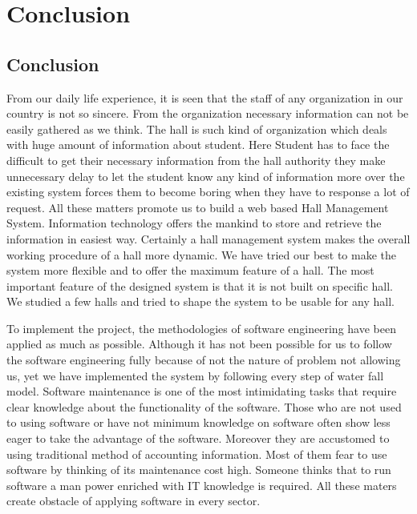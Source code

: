 


\chapter{Conclusion}
 \label{Chapter 7}
 \section{Conclusion}
 From our daily life experience, it is seen that the staff of any organization in our country is not so sincere. From the organization necessary information can not be easily gathered as we think. The hall is such kind of organization which deals with huge amount of information about student. Here Student has to face the difficult to get their necessary information from the hall authority they make unnecessary delay to let the student know any kind of information more over the existing system forces them to become boring when they have to response a lot of request. All these matters promote us to build a web based Hall Management System. Information technology offers the mankind to store and retrieve the information in easiest way. Certainly a hall management system makes the overall working procedure of a hall more dynamic. We have tried our best to make the system more flexible and to offer the maximum feature of a hall. The most important feature of the designed system is that it is not built on specific hall. We studied a few halls and tried to shape the system to be usable for any hall.


 To implement the project, the methodologies of software engineering have been applied as much as possible. Although it has not been possible for us to follow the software engineering fully because of not the nature of problem not allowing us, yet we have implemented the system by following every step of water fall model.
Software maintenance is one of the most intimidating tasks that
require clear knowledge about the functionality of the software.
Those who are not used to using software or have not minimum
knowledge on software often show less eager to take the advantage
of the software. Moreover they are accustomed to using traditional
method of accounting information. Most of them fear to use
software by thinking of its maintenance cost high. Someone thinks
that to run software a man power enriched with IT knowledge is
required. All these maters create obstacle of applying software in
every sector.


